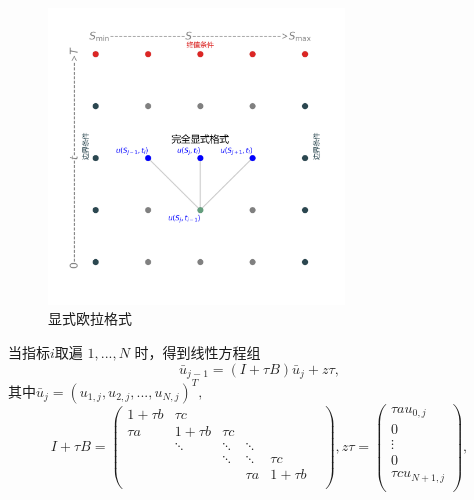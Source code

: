 \documentclass{article}
\begin{document}
\begin{figure}[H]
  \centering
  \includegraphics[width=0.7\textwidth,height=0.7\textwidth]{Images/2_ExpEu.png}
  \caption{显式欧拉格式}
  \label{fig:2_ExpEu}
\end{figure}


当指标$i$取遍 $1,...,N$ 时，得到线性方程组$$\bar{u}_{j-1} = (I + \tau B)\bar{u}_{j} + z\tau,$$
其中$\bar{u}_{j} = (u_{1, j}, u_{2, j},...,u_{N, j})^T,$
$$
I + \tau B = \begin{pmatrix}
                1 +\tau b  &   \tau c     &            &            &            & \\
                \tau a     &   1 +\tau b  &   \tau c   &            &            & \\
                           &   \ddots     &   \ddots   &   \ddots   &            & \\
                           &              &   \ddots   &   \ddots   &  \tau c    & \\
                           &              &            &   \tau a   &  1 +\tau b & \\
            \end{pmatrix},
z\tau = \begin{pmatrix}
            \tau au_{0, j}   \\
            0                \\
            \vdots           \\
            0                \\
            \tau cu_{N+1, j} \\
        \end{pmatrix},
$$
\end{document}
